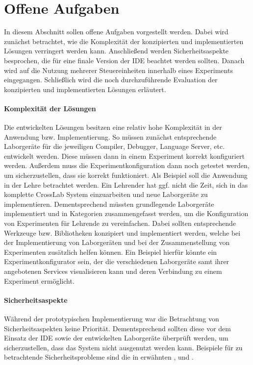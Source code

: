 \section{Offene Aufgaben}\label{section:diskussion:offene-aufgaben}

In diesem Abschnitt sollen offene Aufgaben vorgestellt werden. Dabei wird zunächst betrachtet, wie die Komplexität der konzipierten und implementierten Lösungen verringert werden kann. Anschließend werden Sicherheitsaspekte besprochen, die für eine finale Version der IDE beachtet werden sollten. Danach wird auf die Nutzung mehrerer Steuereinheiten innerhalb eines Experiments eingegangen. Schließlich wird die noch durchzuführende Evaluation der konzipierten und implementierten Lösungen erläutert.

\paragraph{Komplexität der Lösungen}
Die entwickelten Lösungen besitzen eine relativ hohe Komplexität in der Anwendung bzw. Implementierung. So müssen zunächst entsprechende Laborgeräte für die jeweiligen Compiler, Debugger, Language Server, etc. entwickelt werden. Diese müssen dann in einem Experiment korrekt konfiguriert werden. Außerdem muss die Experimentkonfiguration dann noch getestet werden, um sicherzustellen, dass sie korrekt funktioniert. Als Beispiel soll die Anwendung in der Lehre betrachtet werden. Ein Lehrender hat ggf. nicht die Zeit, sich in das komplette CrossLab System einzuarbeiten und neue Laborgeräte zu implementieren. Dementsprechend müssten grundlegende Laborgeräte implementiert und in Kategorien zusammengefasst werden, um die Konfiguration von Experimenten für Lehrende zu vereinfachen. Dabei sollten entsprechende Werkzeuge bzw. Bibliotheken konzipiert und implementiert werden, welche bei der Implementierung von Laborgeräten und bei der Zusammenstellung von Experimenten zusätzlich helfen können. Ein Beispiel hierfür könnte ein Experimentkonfigurator sein, der die verschiedenen Laborgeräte samt ihrer angebotenen Services visualisieren kann und deren Verbindung zu einem Experiment ermöglicht.

\paragraph{Sicherheitsaspekte}
Während der prototypischen Implementierung war die Betrachtung von Sicherheitsaspekten keine Priorität. Dementsprechend sollten diese vor dem Einsatz der IDE sowie der entwickelten Laborgeräte überprüft werden, um sicherzustellen, dass das System nicht ausgenutzt werden kann. Beispiele für zu betrachtende Sicherheitsprobleme sind die in \cite{wu_ceclipse_2011} erwähnten ,  und .

